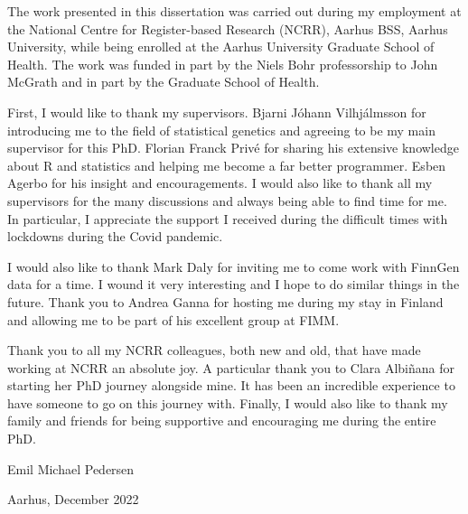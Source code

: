 The work presented in this dissertation was carried out during my employment at the National Centre for Register-based Research (NCRR), Aarhus BSS, Aarhus University, while being enrolled at the Aarhus University Graduate School of Health. The work was funded in part by the Niels Bohr professorship to John McGrath and in part by the Graduate School of Health.

First, I would like to thank my supervisors. Bjarni Jóhann Vilhjálmsson for introducing me to the field of statistical genetics and agreeing to be my main supervisor for this PhD. Florian Franck Privé for sharing his extensive knowledge about R and statistics and helping me become a far better programmer. Esben Agerbo for his insight and encouragements. I would also like to thank all my supervisors for the many discussions and always being able to find time for me. In particular, I appreciate the support I received during the difficult times with lockdowns during the Covid pandemic. 

I would also like to thank Mark Daly for inviting me to come work with FinnGen data for a time. I wound it very interesting and I hope to do similar things in the future. Thank you to Andrea Ganna for hosting me during my stay in Finland and allowing me to be part of his excellent group at FIMM. 

Thank you to all my NCRR colleagues, both new and old, that have made working at NCRR an absolute joy. A particular thank you to Clara Albiñana for starting her PhD journey alongside mine. It has been an incredible experience to have someone to go on this journey with. Finally, I would also like to thank my family and friends for being supportive and encouraging me during the entire PhD.





Emil Michael Pedersen

Aarhus, December 2022